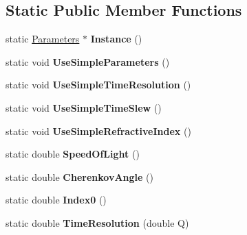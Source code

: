 \subsection*{Static Public Member Functions}
\begin{DoxyCompactItemize}
\item 
\hypertarget{classParameters_a116c287173521b39aaef6d9ae2f1168f}{static \hyperlink{classParameters}{Parameters} $\ast$ {\bfseries Instance} ()}\label{classParameters_a116c287173521b39aaef6d9ae2f1168f}

\item 
\hypertarget{classParameters_aceaf40bdd65a08ebfa507ae05f1a7633}{static void {\bfseries Use\-Simple\-Parameters} ()}\label{classParameters_aceaf40bdd65a08ebfa507ae05f1a7633}

\item 
\hypertarget{classParameters_aa0d5f324fe5c3e1418ece481c11bc3eb}{static void {\bfseries Use\-Simple\-Time\-Resolution} ()}\label{classParameters_aa0d5f324fe5c3e1418ece481c11bc3eb}

\item 
\hypertarget{classParameters_a3c61940ae61811d6ca29490978a2a62b}{static void {\bfseries Use\-Simple\-Time\-Slew} ()}\label{classParameters_a3c61940ae61811d6ca29490978a2a62b}

\item 
\hypertarget{classParameters_a9a9a5eeb5df6d4e60fd9b530fc423aa5}{static void {\bfseries Use\-Simple\-Refractive\-Index} ()}\label{classParameters_a9a9a5eeb5df6d4e60fd9b530fc423aa5}

\item 
\hypertarget{classParameters_acc1d5f6429ddb3ab5bd8b0573f049f19}{static double {\bfseries Speed\-Of\-Light} ()}\label{classParameters_acc1d5f6429ddb3ab5bd8b0573f049f19}

\item 
\hypertarget{classParameters_a0f0992984d8940acce2ad65a4e5be0b4}{static double {\bfseries Cherenkov\-Angle} ()}\label{classParameters_a0f0992984d8940acce2ad65a4e5be0b4}

\item 
\hypertarget{classParameters_a31bf30badb89527522d36cd509a44ec3}{static double {\bfseries Index0} ()}\label{classParameters_a31bf30badb89527522d36cd509a44ec3}

\item 
\hypertarget{classParameters_ad26c530d23bc0f13afb8ed08c060fe13}{static double {\bfseries Time\-Resolution} (double Q)}\label{classParameters_ad26c530d23bc0f13afb8ed08c060fe13}


\end{DoxyCompactItemize}
